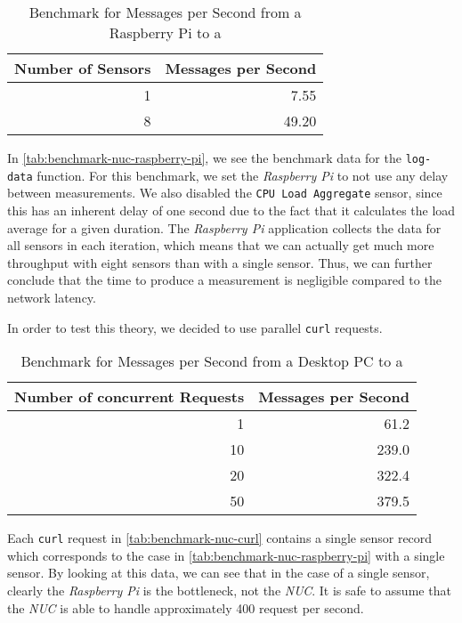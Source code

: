 \begin{table}[H]
  \centering
  \begin{tabular}{|r|r|}
    \hline
    Number of Sensors & Messages per Second \\ \hline
                    1 &                7.55 \\ \hline
                    8 &               49.20 \\ \hline
  \end{tabular}
  \caption{Benchmark for Messages per Second from a Raspberry Pi to a }
  \label{tab:benchmark-nuc-raspberry-pi}
\end{table}

In \autoref{tab:benchmark-nuc-raspberry-pi}, we see the benchmark data for the \texttt{log-data}
function. For this benchmark, we set the \textit{Raspberry Pi} to not use any delay between
measurements. We also disabled the \texttt{CPU Load Aggregate} sensor, since this has an inherent
delay of one second due to the fact that it calculates the load average for a given duration. The
\textit{Raspberry Pi} application collects the data for all sensors in each iteration, which means
that we can actually get much more throughput with eight sensors than with a single sensor. Thus, we
can further conclude that the time to produce a measurement is negligible compared to the network
latency.

In order to test this theory, we decided to use parallel \texttt{curl} requests.

\begin{table}[H]
  \centering
  \begin{tabular}{|r|r|}
    \hline
    Number of concurrent Requests & Messages per Second \\ \hline
                                1 &                61.2 \\ \hline
                               10 &               239.0 \\ \hline
                               20 &               322.4 \\ \hline
                               50 &               379.5 \\ \hline
  \end{tabular}
  \caption{Benchmark for Messages per Second from a Desktop PC to a }
  \label{tab:benchmark-nuc-curl}
\end{table}

Each \texttt{curl} request in \autoref{tab:benchmark-nuc-curl} contains a single sensor record which
corresponds to the case in \autoref{tab:benchmark-nuc-raspberry-pi} with a single sensor. By looking
at this data, we can see that in the case of a single sensor, clearly the \textit{Raspberry Pi} is
the bottleneck, not the \textit{NUC}. It is safe to assume that the \textit{NUC} is able to handle
approximately 400 request per second.

